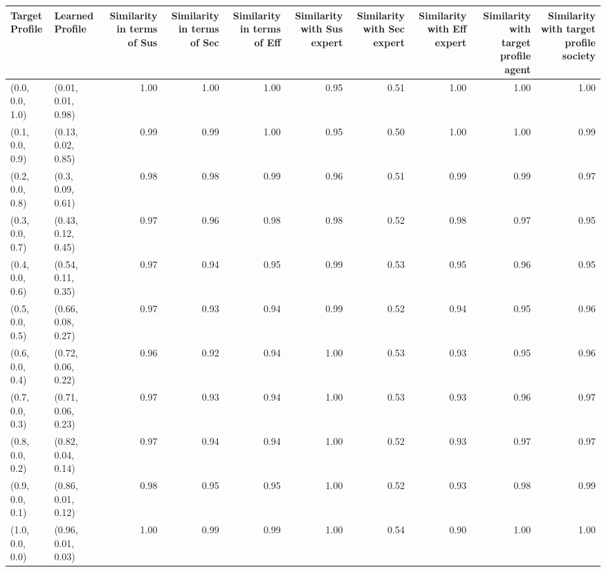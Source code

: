 \begin{tabular}{llrrrrrrrr}
\toprule
Target Profile & Learned Profile & Similarity in terms of Sus & Similarity in terms of Sec & Similarity in terms of Eff & Similarity with Sus expert & Similarity with Sec expert & Similarity with Eff expert & Similarity with target profile agent & Similarity with target profile society \\
\midrule
(0.0, 0.0, 1.0) & (0.01, 0.01, 0.98) & 1.00 & 1.00 & 1.00 & 0.95 & 0.51 & 1.00 & 1.00 & 1.00 \\
(0.1, 0.0, 0.9) & (0.13, 0.02, 0.85) & 0.99 & 0.99 & 1.00 & 0.95 & 0.50 & 1.00 & 1.00 & 0.99 \\
(0.2, 0.0, 0.8) & (0.3, 0.09, 0.61) & 0.98 & 0.98 & 0.99 & 0.96 & 0.51 & 0.99 & 0.99 & 0.97 \\
(0.3, 0.0, 0.7) & (0.43, 0.12, 0.45) & 0.97 & 0.96 & 0.98 & 0.98 & 0.52 & 0.98 & 0.97 & 0.95 \\
(0.4, 0.0, 0.6) & (0.54, 0.11, 0.35) & 0.97 & 0.94 & 0.95 & 0.99 & 0.53 & 0.95 & 0.96 & 0.95 \\
(0.5, 0.0, 0.5) & (0.66, 0.08, 0.27) & 0.97 & 0.93 & 0.94 & 0.99 & 0.52 & 0.94 & 0.95 & 0.96 \\
(0.6, 0.0, 0.4) & (0.72, 0.06, 0.22) & 0.96 & 0.92 & 0.94 & 1.00 & 0.53 & 0.93 & 0.95 & 0.96 \\
(0.7, 0.0, 0.3) & (0.71, 0.06, 0.23) & 0.97 & 0.93 & 0.94 & 1.00 & 0.53 & 0.93 & 0.96 & 0.97 \\
(0.8, 0.0, 0.2) & (0.82, 0.04, 0.14) & 0.97 & 0.94 & 0.94 & 1.00 & 0.52 & 0.93 & 0.97 & 0.97 \\
(0.9, 0.0, 0.1) & (0.86, 0.01, 0.12) & 0.98 & 0.95 & 0.95 & 1.00 & 0.52 & 0.93 & 0.98 & 0.99 \\
(1.0, 0.0, 0.0) & (0.96, 0.01, 0.03) & 1.00 & 0.99 & 0.99 & 1.00 & 0.54 & 0.90 & 1.00 & 1.00 \\
\bottomrule
\end{tabular}
